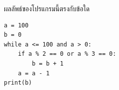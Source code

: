 \question ผลลัพธ์ของโปรแกรมนี้ตรงกับข้อใด
\begin{verbatim}
a = 100
b = 0
while a <= 100 and a > 0:
    if a % 2 == 0 or a % 3 == 0:
        b = b + 1
    a = a - 1
print(b)
\end{verbatim}
